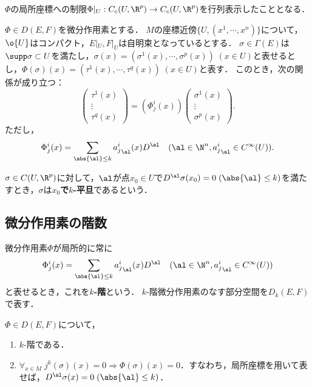 \documentclass[uplatex,dvipdfmx]{jsreport}
\begin{document}
\begin{tcolorbox}[colframe=ForestGreen, colback=ForestGreen!10!white,breakable,colbacktitle=ForestGreen!40!white,coltitle=black,fonttitle=\bfseries\sffamily,
title=]
    $\Phi$の局所座標への制限$\Phi|_U:C_c(U,\R^p)\to C_c(U,\R^p)$を行列表示したこととなる．
\end{tcolorbox}

\begin{theorem}[微分作用素の局所表示]
    $\Phi\in D(E,F)$を微分作用素とする．
    $M$の座標近傍$\{U,(x^1,\cdots,x^n)\}$について，$\o{U}$はコンパクト，$E|_U,F|_U$は自明束となっているとする．
    $\sigma\in\Gamma(E)$は$\supp\sigma\subset U$を満たし，$\sigma(x)=(\sigma^1(x),\cdots,\sigma^p(x))\;(x\in U)$と表せるとし，$\Phi(\sigma)(x)=(\tau^1(x),\cdots,\tau^q(x))\;(x\in U)$と表す．
    このとき，次の関係が成り立つ：
    \[\begin{pmatrix}\tau^1(x)\\\vdots\\\tau^q(x)\end{pmatrix}=(\Phi^i_j(x))\begin{pmatrix}\sigma^1(x)\\\vdots\\\sigma^p(x)\end{pmatrix}.\]
    ただし，
    \[\Phi^i_j(x)=\sum_{\abs{\al}\le k}{a^i_j}_\al(x)D^\al\quad(\al\in\N^n,{a^i_j}_\al\in C^\infty(U)).\]
\end{theorem}

\begin{definition}
    $\sigma\in C(U,\R^p)$に対して，$\al$が点$x_0\in U$で$D^\al\sigma(x_0)=0\;(\abs{\al}\le k)$を満たすとき，$\sigma$は\textbf{$x_0$で$k$-平旦}であるという．
\end{definition}

\subsection{微分作用素の階数}

\begin{definition}
    微分作用素$\Phi$が局所的に常に
    \[\Phi^i_j(x)=\sum_{\abs{\al}\le k}{a^i_j}_\al(x)D^\al\quad(\al\in\N^n,{a^i_j}_\al\in C^\infty(U))\]
    と表せるとき，これを\textbf{$k$-階}という．
    $k$-階微分作用素のなす部分空間を$D_k(E,F)$で表す．
\end{definition}

\begin{corollary}
    $\Phi\in D(E,F)$について，
    \begin{enumerate}
        \item $k$-階である．
        \item $\forall_{x\in M}\;j^k(\sigma)(x)=0\Rightarrow\Phi(\sigma)(x)=0$．すなわち，局所座標を用いて表せば，$D^\al\sigma(x)=0\;(\abs{\al}\le k)$．
    \end{enumerate}
\end{corollary}
\end{document}
